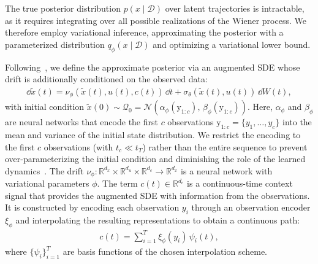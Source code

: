 \documentclass[preprint,12pt]{elsarticle}
\begin{document}
The true posterior distribution $p(x \mid \mathcal{D})$ over latent trajectories is intractable, as it requires integrating over all possible realizations of the Wiener process. We therefore employ variational inference, approximating the posterior with a parameterized distribution $q_\phi(x \mid \mathcal{D})$ and optimizing a variational lower bound.

Following~\citet{li2020scalable}, we define the approximate posterior via an augmented SDE whose drift is additionally conditioned on the observed data:
\begin{align}
    \dd \tilde{x}(t) = \nu_\phi(\tilde{x}(t), u(t), c(t))\,\dd t + \sigma_\theta(\tilde{x}(t), u(t))\,\dd W(t),
    \label{eq:aug_sde}
\end{align}
with initial condition $\tilde{x}(0) \sim \mathcal{Q}_0 = \mathcal{N}(\alpha_\phi(\mathrm{y}_{1:c}),\, \beta_\phi(\mathrm{y}_{1:c}))$. Here, $\alpha_\phi$ and $\beta_\phi$ are neural networks that encode the first $c$ observations $\mathrm{y}_{1:c} = \{y_1, \ldots, y_c\}$ into the mean and variance of the initial state distribution. We restrict the encoding to the first $c$ observations (with $t_c \ll t_T$) rather than the entire sequence to prevent over-parameterizing the initial condition and diminishing the role of the learned dynamics~\citep{elgazzar2024generative}. The drift $\nu_\phi: \mathbb{R}^{d_x} \times \mathbb{R}^{d_u} \times \mathbb{R}^{d_c} \to \mathbb{R}^{d_x}$ is a neural network with variational parameters $\phi$. The term $c(t) \in \mathbb{R}^{d_c}$ is a continuous-time context signal that provides the augmented SDE with information from the observations. It is constructed by encoding each observation $y_i$ through an observation encoder $\xi_\phi$ and interpolating the resulting representations to obtain a continuous path:
\begin{align}
    c(t) = \sum_{i=1}^{T} \xi_\phi(y_i)\,\psi_i(t),
    \label{eq:context}
\end{align}
where $\{\psi_i\}_{i=1}^{T}$ are basis functions of the chosen interpolation scheme.
\end{document}
